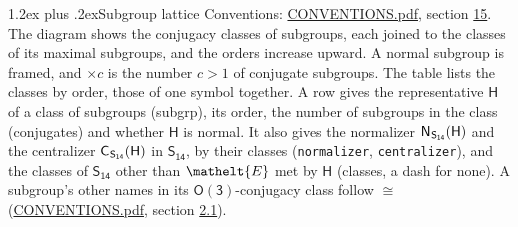 \documentclass[10pt,a4paper]{article}
\makeatletter
\renewcommand\section{\@startsection{section}{1}{\z@}{-3ex plus -1ex minus -.2ex}%
  {1.2ex plus .2ex}{\normalfont\large\sffamily\bfseries\color{parttitle}}}
\numberwithin{equation}{section}
\newcommand{\eltfont}[1]{{\let\sigma\eltsigma\mathelt{#1}}}
\newcommand{\grp}[1]{\mathsf{#1}}
\newcommand{\cls}[1]{\eltfont{#1}}
\newcommand{\samecls}{\cong}
\newcommand{\hairsp}{\mkern1mu}
\makeatother
\begin{document}
\section{Subgroup lattice}\label{s:subgroups}
Conventions: \href{../../CONVENTIONS.pdf}{CONVENTIONS.pdf}, section \href{../../CONVENTIONS.pdf\#conv.15}{15}.
The diagram shows the conjugacy classes of subgroups, each joined to the classes of its maximal subgroups, and the orders increase upward. \label{n:index.conjugates.c}A normal subgroup is framed, and ${\times}c$ is the number $c > 1$ of conjugate subgroups. The table lists the classes by order, those of one symbol together. \label{n:group.H}\label{n:head.subgroup}\label{n:head.order}\label{n:head.conjugates}\label{n:head.normal}A row gives the representative $\grp{H}$ of a class of subgroups (subgrp), its order, the number of subgroups in the class (conjugates) and whether $\grp{H}$ is normal. \label{n:group.normalizer}\label{n:group.centralizer}\label{n:head.classes}It also gives the normalizer $\grp{N}_{\hairsp \grp{S_{14}}}(\grp{H})$ and the centralizer $\grp{C}_{\hairsp \grp{S_{14}}}(\grp{H})$ in $\grp{S_{14}}$, by their classes (\texttt{normalizer}, \texttt{centralizer}), and the classes of $\grp{S_{14}}$ other than $\cls{E}$ met by $\grp{H}$ (classes, a dash for none). A subgroup's other names in its \href{O3.pdf}{$\grp{O(3)}$}-conjugacy class follow $\samecls$ (\href{../../CONVENTIONS.pdf}{CONVENTIONS.pdf}, section \href{../../CONVENTIONS.pdf\#conv.2.1}{2.1}).
\begin{center}
\end{center}
\end{document}

